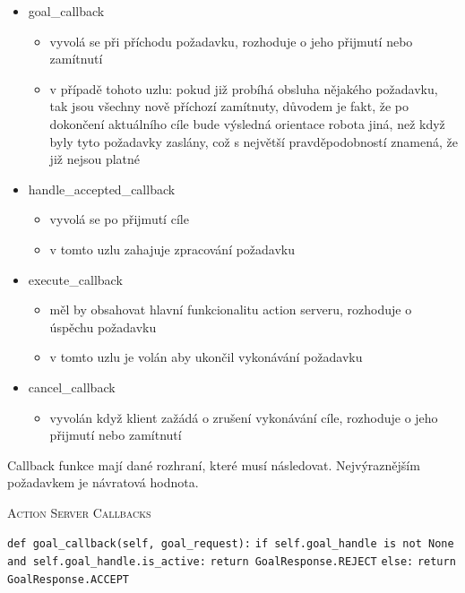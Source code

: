 \begin{itemize}[leftmargin=*]
	\item{goal\_callback}
	\vspace*{-0.5em}
	\begin{itemize}
		\item{vyvolá se při příchodu požadavku, rozhoduje o jeho přijmutí nebo zamítnutí}
		\item{v případě tohoto uzlu: pokud již probíhá obsluha nějakého požadavku, tak jsou všechny nově příchozí zamítnuty, důvodem je fakt, že po dokončení aktuálního cíle bude výsledná orientace robota jiná, než když byly tyto požadavky zaslány, což s největší pravděpodobností znamená, že již nejsou platné}
	\end{itemize}
	\item{handle\_accepted\_callback}
	\vspace*{-0.5em}
	\begin{itemize}
		\item{vyvolá se po přijmutí cíle}
		\item{v tomto uzlu zahajuje zpracování požadavku}
	\end{itemize}
	\item{execute\_callback}
	\vspace*{-0.5em}
	\begin{itemize}
		\item{měl by obsahovat hlavní funkcionalitu action serveru, rozhoduje o úspěchu požadavku}
		\item{v tomto uzlu je volán aby ukončil vykonávání požadavku}
	\end{itemize}
	\item{cancel\_callback}
	\vspace*{-0.5em}
	\begin{itemize}
		\item{vyvolán když klient zažádá o zrušení vykonávání cíle, rozhoduje o jeho přijmutí nebo zamítnutí}
	\end{itemize}
\end{itemize} 

Callback funkce mají dané rozhraní, které musí následovat. Nejvýraznějším požadavkem je návratová hodnota.
\begin{algorithm}[h!]
	\label{}
	\caption{\textsc{Action Server Callbacks}}
	
	\DontPrintSemicolon
	\SetAlgoNoLine
	\SetNlSty{}{}{:}
	\SetNlSkip{-1.1em}
	
	\BlankLine \Indp\Indpp
	
	\texttt{def goal\_callback(self, goal\_request):}\;
	\Indp\Indp
	\texttt{if self.goal\_handle is not None and self.goal\_handle.is\_active:}\;
	\Indp\Indp
	\texttt{return GoalResponse.REJECT}\;
	\Indm\Indm
	\texttt{else:}\;
	\Indp\Indp
	\texttt{return GoalResponse.ACCEPT}\;

\end{algorithm}


